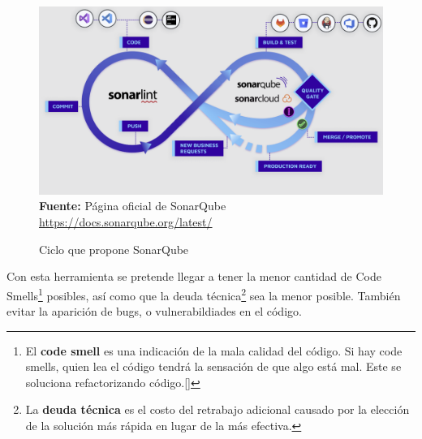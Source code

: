 \begin{figure}[htb!]
    \centering
    \caption{Ciclo que propone SonarQube} \label{fig:sonar-cicle}
    \centering
    \includegraphics[scale=0.3]{./Ilustraciones/sonarqube.png}\\
    \textbf{Fuente:} Página oficial de SonarQube \url{https://docs.sonarqube.org/latest/}
\end{figure}

Con esta herramienta se pretende llegar a tener la menor cantidad de Code
Smells\footnote{El \textbf{code smell} es una indicación de la mala calidad del
código. Si hay code smells, quien lea el código tendrá la sensación de que algo
está mal. Este se soluciona refactorizando código.[\cite{code-smell}]}
posibles, así como que la deuda técnica\footnote{La \textbf{deuda técnica} es
    el costo del retrabajo adicional causado por la elección de la solución más
    rápida en lugar de la más efectiva.\cite{deuda-tecnica}} sea la menor posible.
También evitar la aparición de bugs, o vulnerabildiades en el código.